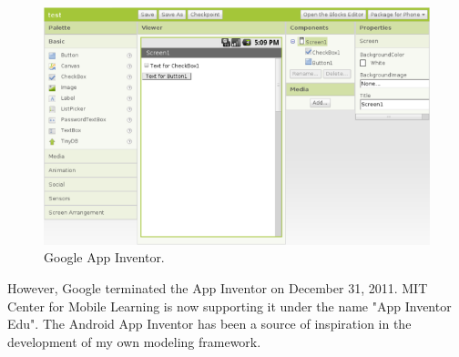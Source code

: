 \begin{figure}[h!]
\centering
\includegraphics[width=1.0\textwidth]{images/chap4_app_inventor.png}
\caption{Google App Inventor.}
\label{fig:app_inventor}
\end{figure}

However, Google terminated the App Inventor on December 31, 2011. MIT Center for Mobile Learning is now supporting it under the name "App Inventor Edu". The Android App Inventor has been a source of inspiration in the development of my own modeling framework. 

